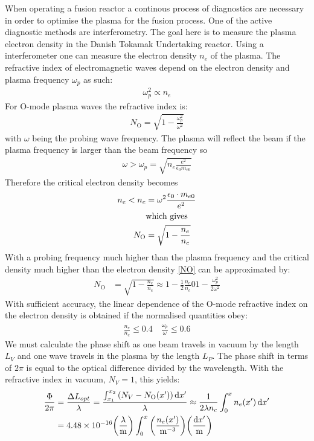 When operating a fusion reactor a continous process of diagnostics are necessary in order to optimise the plasma for the fusion process. One of the active diagnostic methods are interferometry.
The goal here is to measure the plasma electron density in the Danish Tokamak Undertaking reactor.
Using a interferometer one can measure the electron density \(n_e\) of the plasma. The refractive index of electromagnetic waves depend on the electron density and plasma frequency \(\omega_p\) as such:
\begin{align}
  \omega_p^2 \propto n_e
\end{align}
For O-mode plasma waves the refractive index is:
\begin{align}
  N_{\mathrm{O}} = \sqrt{1-\frac{\omega_p^2}{\omega^2}}
\end{align}
with \(\omega\) being the probing wave frequency.
The plasma will reflect the beam if the plasma frequency is larger than the beam frequency so
\begin{align}
  \omega > \omega_p = \sqrt{n_e\frac{e^2}{\epsilon_0 m_{e0}}}
\end{align}
Therefore the critical electron density becomes
\begin{align}
  n_e < n_c &= \omega^2\frac{\epsilon_0\cdot m_{e0}}{e^2} \label{nenc}\\
  &\qq*{which gives} \nonumber \\
  N_{\mathrm{O}} &= \sqrt{1-\frac{n_e}{n_c}}\label{NO}
\end{align}
With a probing frequency much higher than the plasma frequency and the critical density much higher than the electron density \cref{NO} can be approximated by:
\begin{align}
  N_{\mathrm{O}} &= \sqrt{1-\frac{n_e}{n_c}} \approx 1-\frac{1}{2}\frac{n_e}{n_c} 0 1-\frac{\omega_p^2}{2\omega^2}
\end{align}
With sufficient accuracy, the linear dependence of the O-mode refractive index on the electron density is obtained if the normalised quantities obey:
\begin{align}
  \frac{n_e}{n_c} \leq 0.4 \quad \frac{\omega_p}{\omega} \leq 0.6
\end{align}
We must calculate the phase shift as one beam travels in vacuum by the length \(L_V\) and one wave travels in the plasma by the length \(L_P\). The phase shift in terms of \(2 \pi\) is equal to the optical difference divided by the wavelength. With the refractive index in vacuum, \(N_V=1\), this yields:
\begin{align}
  \frac{\Phi}{2\pi} &= \frac{\Delta L_{opt}}{\lambda} = \frac{\int_{x_1}^{x_2}\pqty{N_V-N_{\mathrm{O}}(x')}\dd{x'}}{\lambda} \approx \frac{1}{2\lambda n_c}\int_{0}^{x}n_e(x')\dd{x'}\\
  &= 4.48\times 10^{-16} \pqty{\frac{\lambda}{\si{\meter}}}\int_{0}^{x}\pqty{\frac{n_e(x')}{\si{\per\meter\cubed}}}\pqty{\frac{\dd{x'}}{\si{\meter}}}
\end{align}
